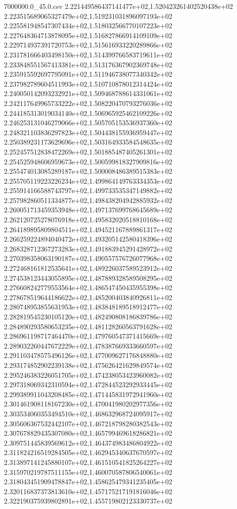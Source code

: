 \begin{filecontents*}{7000000.0_45.0.csv}
2.221449586437141477e+02,1.520423261402520438e+02
2.223515689065327479e+02,1.519231031896097193e+02
2.225581948547307434e+02,1.518032566770107223e+02
2.227648364713878095e+02,1.516827866914109109e+02
2.229714937391720753e+02,1.515616933220289866e+02
2.231781666403498150e+02,1.514399766583719611e+02
2.233848551567413381e+02,1.513176367902369748e+02
2.235915592697795091e+02,1.511946738077340342e+02
2.237982789604511993e+02,1.510710878012314424e+02
2.240050142093232921e+02,1.509468788614331061e+02
2.242117649965733222e+02,1.508220470793276036e+02
2.244185313019034140e+02,1.506965925462109226e+02
2.246253131046279066e+02,1.505705153536937360e+02
2.248321103836297823e+02,1.504438155936959447e+02
2.250389231173629696e+02,1.503164933584548635e+02
2.252457512838472269e+02,1.501885487405261301e+02
2.254525948606959673e+02,1.500599818327909816e+02
2.255474013085289187e+02,1.500008486389515383e+02
2.255705119223226234e+02,1.499864149763334353e+02
2.255914166588743797e+02,1.499733535347149882e+02
2.257982860511334877e+02,1.498438204942885932e+02
2.260051713459353948e+02,1.497137699768645689e+02
2.262120725278076918e+02,1.495832020518810168e+02
2.264189895809804511e+02,1.494521167889861317e+02
2.266259224894040472e+02,1.493205142580418396e+02
2.268328712367273283e+02,1.491883945291428972e+02
2.270398358063190187e+02,1.490557576726077968e+02
2.272468161812535641e+02,1.489226037589523912e+02
2.274538123443055895e+02,1.487889328589508295e+02
2.276608242779553564e+02,1.486547450435955398e+02
2.278678519644186622e+02,1.485200403840926811e+02
2.280748953855631953e+02,1.483848189518912477e+02
2.282819545230105120e+02,1.482490808186839786e+02
2.284890293580653235e+02,1.481128260563791628e+02
2.286961198717464470e+02,1.479760547371415669e+02
2.289032260447672229e+02,1.478387669333660597e+02
2.291103478575496126e+02,1.477009627176848880e+02
2.293174852902239138e+02,1.475626421629849574e+02
2.295246383226051705e+02,1.474238053423960082e+02
2.297318069342310594e+02,1.472844523292933445e+02
2.299389911043208485e+02,1.471445831972941960e+02
2.301461908118167230e+02,1.470041980202977356e+02
2.303534060353494510e+02,1.468632968724095917e+02
2.305606367532442107e+02,1.467218798280382543e+02
2.307678829435307080e+02,1.465799469618286821e+02
2.309751445839569612e+02,1.464374983486804922e+02
2.311824216519284505e+02,1.462945340637670597e+02
2.313897141245880107e+02,1.461510541825264227e+02
2.315970219787511155e+02,1.460070587806540061e+02
2.318043451909478847e+02,1.458625479341235405e+02
2.320116837373813610e+02,1.457175217191816046e+02
2.322190375939802891e+02,1.455719802123330737e+02

\end{filecontents*}
